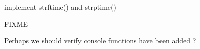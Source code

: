 
\begin{DoxyRefList}
\item[\label{todo__todo000001}%
\hypertarget{todo__todo000001}{}%
Global \hyperlink{time_8h_a7ffc52def0c7fbf70c50248e3f7d6a8a}{asctime\-\_\-r} (tm\-\_\-t $\ast$t, char $\ast$buf)]implement strftime() and strptime()  
\item[\label{todo__todo000002}%
\hypertarget{todo__todo000002}{}%
Global \hyperlink{fatfs__utils_8h_a97a2409a53057e1a63537f196ff00a50}{fatfs\-\_\-cat} (char $\ast$name)]F\-I\-X\-M\-E  
\item[\label{todo__todo000003}%
\hypertarget{todo__todo000003}{}%
Global \hyperlink{posix_8h_a31986cce890109c211ccb14151aafd0e}{isatty} (int fileno)]Perhaps we should verify console functions have been added ? 
\end{DoxyRefList}